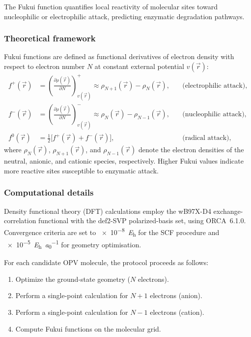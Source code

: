 \documentclass[11pt,a4paper]{article}
\begin{document}
The Fukui function quantifies local reactivity of molecular sites toward nucleophilic or electrophilic attack, predicting enzymatic degradation pathways.

\subsubsection{Theoretical framework}

Fukui functions are defined as functional derivatives of electron density with respect to electron number $N$ at constant external potential $v(\vec{r})$:
\begin{align}
f^+(\vec{r}) &= \left(\frac{\partial \rho(\vec{r})}{\partial N}\right)_{v(\vec{r})}^+ \approx \rho_{N+1}(\vec{r}) - \rho_N(\vec{r}), \quad &\text{(electrophilic attack),}\label{eq:fukui_plus}\\
f^-(\vec{r}) &= \left(\frac{\partial \rho(\vec{r})}{\partial N}\right)_{v(\vec{r})}^- \approx \rho_N(\vec{r}) - \rho_{N-1}(\vec{r}), \quad &\text{(nucleophilic attack),}\label{eq:fukui_minus}\\
f^0(\vec{r}) &= \tfrac{1}{2}\bigl[f^+(\vec{r}) + f^-(\vec{r})\bigr], \quad &\text{(radical attack),}\label{eq:fukui_zero}
\end{align}
where $\rho_N(\vec{r})$, $\rho_{N+1}(\vec{r})$, and $\rho_{N-1}(\vec{r})$ denote the electron densities of the neutral, anionic, and cationic species, respectively. Higher Fukui values indicate more reactive sites susceptible to enzymatic attack.

\subsubsection{Computational details}

Density functional theory (DFT) calculations employ the wB97X-D4 exchange-correlation functional with the def2-SVP polarized-basis set, using ORCA~6.1.0. Convergence criteria are set to \SI{e-8}{\hartree} for the SCF procedure and \SI{e-5}{\hartree\per\bohr} for geometry optimisation.

For each candidate OPV molecule, the protocol proceeds as follows:
\begin{enumerate}
    \item Optimize the ground-state geometry ($N$ electrons).
    \item Perform a single-point calculation for $N+1$ electrons (anion).
    \item Perform a single-point calculation for $N-1$ electrons (cation).
    \item Compute Fukui functions on the molecular grid.
\end{enumerate}
\end{document}
